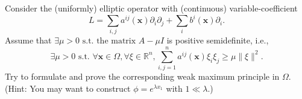 \begin{pro}
  Consider the (uniformly) elliptic operator with (continuous)
  variable-coefficient
  \begin{displaymath}
  L=\sum_{i,j}a^{ij}(\mathbf{x})\partial_i\partial_j +
  \sum_ib^i(\mathbf{x})\partial_i.
\end{displaymath}
Assume that $\exists \mu>0 \text{ s.t. the matrix } A-\mu I$ is positive semidefinite,
i.e.,
  \begin{displaymath}
    \exists \mu>0 \text{ s.t. } \forall \mathbf{x}\in\Omega,
    \forall \xi\in\mathbb{R}^n, \sum_{i,j=1}^na^{ij}(\mathbf{x})\xi_i\xi_j \ge
    \mu\|\xi\|^2.
  \end{displaymath}
  Try to formulate and prove the corresponding weak maximum principle in $\Omega$.
  (Hint: You may want to construct $\phi=e^{\lambda x_1}$ with
  $1\ll \lambda$.)
\end{pro}
